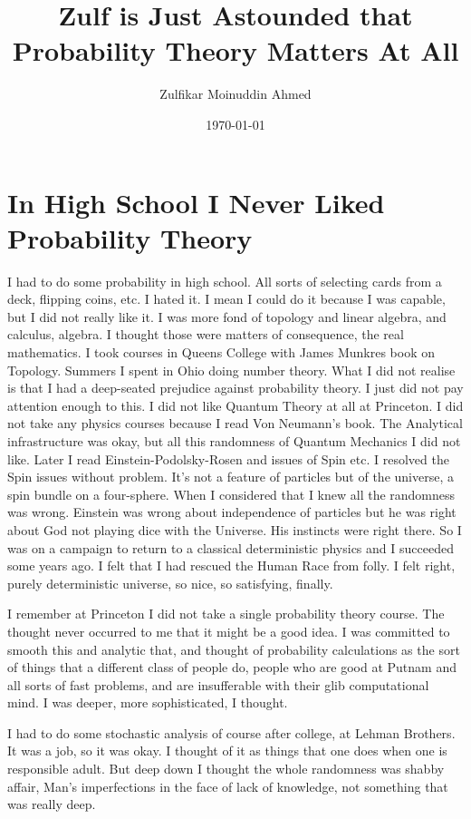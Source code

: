 \documentclass{amsart}
\title{Zulf is Just Astounded that Probability Theory Matters At All}
\author{Zulfikar Moinuddin Ahmed}
\date{\today}
\begin{document}
\maketitle

\section{In High School I Never Liked Probability Theory}

I had to do some probability in high school.  All sorts of selecting cards from a deck, flipping coins, etc.  I hated it.  I mean I could do it because I was capable, but I did not really like it.  I was more fond of topology and linear algebra, and calculus, algebra.  I thought those were matters of consequence, the real mathematics.  I took courses in Queens College with James Munkres book on Topology.  Summers I spent in Ohio doing number theory.  What I did not realise is that I had a deep-seated prejudice against probability theory.  I just did not pay attention enough to this.  I did not like Quantum Theory at all at Princeton.  I did not take any physics courses because I read Von Neumann's book.  The Analytical infrastructure was okay, but all this randomness of Quantum Mechanics I did not like.  Later I read Einstein-Podolsky-Rosen and issues of Spin etc.  I resolved the Spin issues without problem.  It's not a feature of particles but of the universe, a spin bundle on a four-sphere.  When I considered that I knew all the randomness was wrong.  Einstein was wrong about independence of particles but he was right about God not playing dice with the Universe.  His instincts were right there.  So I was on a campaign to return to a classical deterministic physics and I succeeded some years ago.  I felt that I had rescued the Human Race from  folly.  I felt right, purely deterministic universe, so nice, so satisfying, finally.

I remember at Princeton I did not take a single probability theory course.  The thought never occurred to me that it might be a good idea.  I was committed to smooth this and analytic that, and thought of probability calculations as the sort of things that a different class of people do, people who are good at Putnam and all sorts of fast problems, and are insufferable with their glib computational mind.  I was deeper, more sophisticated, I thought.

I had to do some stochastic analysis of course after college, at Lehman Brothers.  It was a job, so it was okay.  I thought of it as things that one does when one is responsible adult.  But deep down I thought the whole randomness was shabby affair, Man's imperfections in the face of lack of knowledge, not something that was really deep.  
\end{document}

